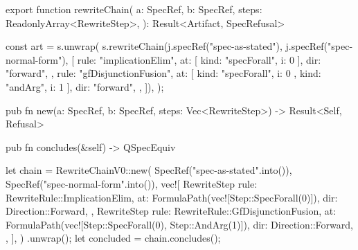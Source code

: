 \begin{tssrc}
export function rewriteChain(
  a: SpecRef,
  b: SpecRef,
  steps: ReadonlyArray<RewriteStep>,
): Result<Artifact, SpecRefusal>
\end{tssrc}
\begin{tssrc}
const art = s.unwrap(
  s.rewriteChain(j.specRef("spec-as-stated"), j.specRef("spec-normal-form"), [
    {
      rule: "implicationElim",
      at: [{ kind: "specForall", i: 0 }],
      dir: "forward",
    },
    {
      rule: "gfDisjunctionFusion",
      at: [{ kind: "specForall", i: 0 }, { kind: "andArg", i: 1 }],
      dir: "forward",
    },
  ]),
);
\end{tssrc}
\begin{rustsrc}
pub fn new(a: SpecRef, b: SpecRef, steps: Vec<RewriteStep>) -> Result<Self, Refusal>

pub fn concludes(&self) -> QSpecEquiv
\end{rustsrc}
\begin{rustsrc}
let chain = RewriteChainV0::new(
    SpecRef("spec-as-stated".into()),
    SpecRef("spec-normal-form".into()),
    vec![
        RewriteStep {
            rule: RewriteRule::ImplicationElim,
            at: FormulaPath(vec![Step::SpecForall(0)]),
            dir: Direction::Forward,
        },
        RewriteStep {
            rule: RewriteRule::GfDisjunctionFusion,
            at: FormulaPath(vec![Step::SpecForall(0), Step::AndArg(1)]),
            dir: Direction::Forward,
        },
    ],
)
.unwrap();
let concluded = chain.concludes();
\end{rustsrc}
